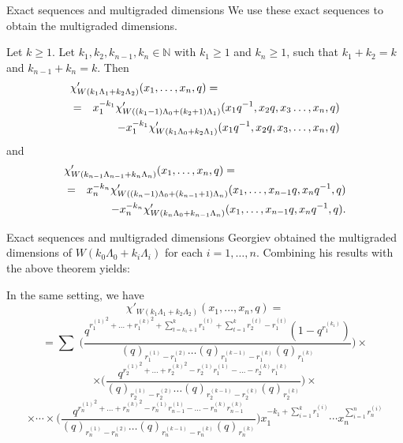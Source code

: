 \documentclass{beamer}
\begin{document}
\begin{frame}{Exact sequences and multigraded dimensions}
 We use these exact sequences to obtain
the multigraded dimensions.
\begin{theorem}\label{gdimthrm}
Let $k \ge 1$.\small
Let $k_1, k_2, k_{n-1}, k_n \in \mathbb{N}$ with $k_1 \ge 1$ and $k_n \ge 1$,
such that $k_1 + k_2 = k$ and $k_{n-1} + k_n = k$. Then
\begin{eqnarray} 
\lefteqn{\chi'_{W(k_1\Lambda_1 + k_2\Lambda_2)}(x_1,\dots,x_n,q) =
  \nonumber }\\ &=&x_1^{-k_1}\chi'_{W((k_1-1)\Lambda_0 +
  (k_2+1)\Lambda_1)}(x_1q^{-1},x_2q, x_3\dots,x_n,q)\\ && -
x_1^{-k_1}\chi'_{W(k_1\Lambda_0 +
  k_2\Lambda_1)}(x_1q^{-1},x_2q,x_3,\dots,x_n,q)\nonumber
\end{eqnarray}
and
\begin{eqnarray}
\lefteqn{\chi'_{W(k_{n-1}\Lambda_{n-1} + k_n
    \Lambda_n)}(x_1,\dots,x_n,q) = \nonumber}
\\ &=&x_n^{-k_n}\chi'_{W((k_n-1)\Lambda_0 +
  (k_{n-1}+1)\Lambda_n)}(x_1,\dots,x_{n-1}q,x_nq^{-1},q)\\ && -
x_n^{-k_n}\chi'_{W(k_n\Lambda_0 +
  k_{n-1}\Lambda_n)}(x_1,\dots,x_{n-1}q,x_nq^{-1},q).\nonumber
\end{eqnarray}
\end{theorem}
\end{frame}
\begin{frame}{Exact sequences and multigraded dimensions}
 Georgiev obtained the multigraded dimensions of $W(k_0\Lambda_0 + k_i \Lambda_i)$ for each
 $i=1,\dots,n$. Combining his results with the above theorem yields:
 \begin{corollary}\label{gdim}
In the same setting, we have\small $$
\chi'_{W(k_1\Lambda_1 + k_2\Lambda_2)}(x_1,\dots,x_n,q)=
$$
$$
=\sum_{}\;
\bigg(\frac{q^{{r_{1}^{(1)}}^{2}+ \ldots + {r_{1}^{(k)}}^{2} +
\sum_{t=k_1+1}^{k} r_{1}^{(t)} + \sum_{t=1}^k r_2^{(t)} - r_1^{(t)} }
(1-q^{r_1^{(k_1)}})}{(q)_{r_{1}^{(1)} -
r_{1}^{(2)}} \ldots (q)_{r_{1}^{(k - 1)} - r_{1}^{(k)}}
(q)_{r_{1}^{(k)}}}\bigg)\times$$ $$
\times \bigg( \frac{q^{{r_{2}^{(1)}}^{2} + \ldots + {r_{2}^{(k)}}^{2} -
r_{2}^{(1)} r_{1}^{(1)} - \ldots - r_{2}^{(k)}r_{1}^{(k)}
 }}{(q)_{r_{2}^{(1)}
- r_{2}^{(2)}} \ldots (q)_{r_{2}^{(k - 1)}
- r_{2}^{(k)}} (q)_{r_{2}^{(k)}}}\bigg) \times$$
$$\times\cdots\times \bigg(
\frac{q^{{r_{n}^{(1)}}^{2} + \ldots + {r_{n}^{(k)}}^{2} -
r_{n}^{(1)} r_{n - 1}^{(1)} - \ldots - r_{n}^{(k)}r_{n - 1}^{(k)}
}}{(q)_{r_{n}^{(1)}
- r_{n}^{(2)}} \ldots (q)_{r_{n}^{(k - 1)}
- r_{n}^{(k)}} (q)_{r_{n}^{(k)}}}\bigg) x_1^{-k_1 + \sum_{i=1}^k r_1^{(i)}}\cdots x_n^{\sum_{i=1}^n r_n^{(i)}}$$
\end{corollary}

\end{frame}
\end{document}
